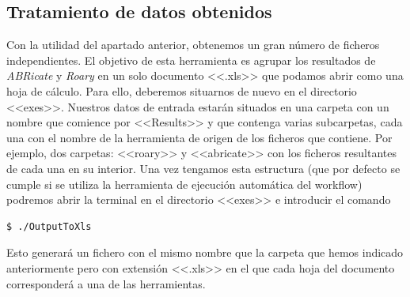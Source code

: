 \subsection{Tratamiento de datos obtenidos}
Con la utilidad del apartado anterior, obtenemos un gran número de ficheros independientes. El objetivo de esta herramienta es agrupar los resultados de \textit{ABRicate} y \textit{Roary} en un solo documento <<.xls>> que podamos abrir como una hoja de cálculo. Para ello, deberemos situarnos de nuevo en el directorio <<exes>>. Nuestros datos de entrada estarán situados en una carpeta con un nombre que comience por <<Results>> y que contenga varias subcarpetas, cada una con el nombre de la herramienta de origen de los ficheros que contiene. Por ejemplo, dos carpetas: <<roary>> y <<abricate>> con los ficheros resultantes de cada una en su interior. Una vez tengamos esta estructura (que por defecto se cumple si se utiliza la herramienta de ejecución automática del workflow) podremos abrir la terminal en el directorio <<exes>> e introducir el comando
\begin{lstlisting}[language=bash]
    $ ./OutputToXls
\end{lstlisting}
Esto generará un fichero con el mismo nombre que la carpeta que hemos indicado anteriormente pero con extensión <<.xls>> en el que cada hoja del documento corresponderá a una de las herramientas.
\newpage \thispagestyle{empty} %